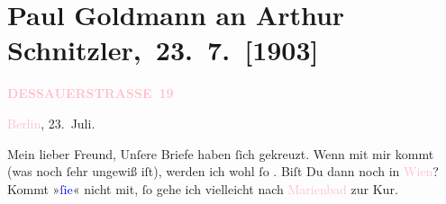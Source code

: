 

\renewcommand{\erwaehntePersonen}{Personen: Richard Beer-Hofmann, Theodore Rottenberg, Olga Schnitzler, Heinrich Schnitzler}
\renewcommand{\erwaehnteOrte}{Orte: Berlin, Dessauer Straße, Eppan an der Weinstraße, Marienbad, Südtirol, Tirol, Wien}
\renewcommand{\erwaehnteWerke}{Werke: Dr. Arthur Schnitzler vermählt sich, Prager Tagblatt}
\section[ Paul Goldmann an Arthur Schnitzler, 23. 7. {[}1903{]}]{Paul Goldmann an Arthur Schnitzler, 23. 7. {[}1903{]}}
\nopagebreak{}
\rehead{ }\normalsize\beginnumbering{}
\toendnotes[C]{\smallbreak\pagebreak[2]}
\toendnotes[C]{\smallbreak}
\pstart
           \noindent{}\raggedleft{}{\pb}\textcolor{gray}{\textbf{\textcolor{pink}{DESSAUERSTRASSE 19}{}\ledrightnote{\textcolor{pink}{Dessauer Straße}}}}\pend
           
\pstart
           \textcolor{pink}{Berlin}{}\ledrightnote{\textcolor{pink}{Berlin}}, 23. Juli.\pend
           
\pstart\center{}Mein lieber Freund,\pend
\pstart
           Unſere Briefe haben ſich gekreuzt. Wenn \label{K_L03378-1v}\label{K_L03378-1h} mit mir kommt (was noch ſehr ungewiß iſt), werden ich wohl ſo \label{K_L03378-2v}\label{K_L03378-2h}. Biſt Du dann noch in \textcolor{pink}{Wien}{}\ledrightnote{\textcolor{pink}{Wien}}? Kommt »\textcolor{blue}{ſie}{}\ledrightnote{{$\rightarrow$}\textcolor{blue}{Theodore Rottenberg}}« nicht mit, ſo gehe ich
               vielleicht nach \textcolor{pink}{Marienbad}{}\ledrightnote{\textcolor{pink}{Marienbad}} zur Kur.\pend
           
